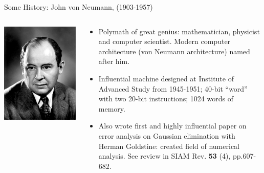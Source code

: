 \documentclass[aspectratio=169]{beamer}
\newcommand{\mypause}{}
\newcommand{\cramplist}{
	\setlength{\itemsep}{0in}
	\setlength{\partopsep}{0in}
	\setlength{\topsep}{0in}}
\begin{document}
\begin{frame}{Some History: John von Neumann, (1903-1957)}
  \begin{columns}
    
    \begin{column}{0.4\linewidth}
      \includegraphics[width=\linewidth]{JohnvonNeumann-LosAlamos.png}
    \end{column}

    \begin{column}{0.6\linewidth}
      \begin{itemize}\cramplist
      \item Polymath of great genius: mathematician, physicist and
        computer scientist. Modern computer architecture (von Neumann
        architecture) named after him.%
        \mypause%
      \item Influential machine designed at Institute of Advanced
        Study from 1945-1951; 40-bit ``word'' with two 20-bit
        instructions; 1024 words of memory.
        \mypause%
      \item Also wrote first and highly influential paper on error
        analysis on Gaussian elimination with Herman Goldstine:
        created field of numerical analysis. See review in SIAM Rev.
        {\bf 53} (4), pp.607-682.
      \end{itemize}
    \end{column}
  \end{columns}
\end{frame}
\end{document}
